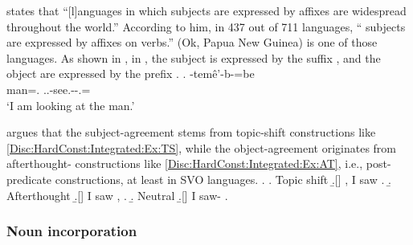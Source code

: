  states that
``[l]anguages in which  subjects are expressed by  affixes are widespread throughout the world.''
According to him,
in 437 out of 711 languages,
`` subjects are expressed by affixes on verbs.''
 (Ok, Papua New Guinea) is one of those languages.
As shown in \Next, in ,
the subject is expressed by the suffix , and
the object are expressed by the prefix .
%
\exg.
   -tem\^{e}'-b-=be \\
  man=. ..-see.--.= \\
 `I am looking at the man.'
 \hfill{\cite[261]{fedden07}}


 argues that
the subject-agreement stems from topic-shift constructions like \ref{Disc:HardConst:Integrated:Ex:TS},
while the object-agreement originates from afterthought- constructions like \ref{Disc:HardConst:Integrated:Ex:AT},
i.e., post-predicate constructions,
at least in SVO languages.
%
\ex.\label{Disc:HardConst:Integrated:Ex:AT}
 \a. Topic shift
 \b.[] , I saw .
 \b. Afterthought
 \b.[] I saw , .
 \b. Neutral
 \b.[] I saw- .




\subsubsection{Noun incorporation}

